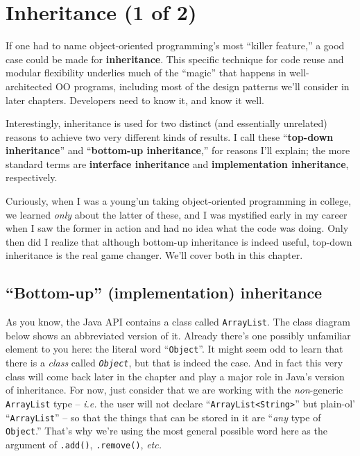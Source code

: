 
\chapter{Inheritance (1 of 2)}
\label{ch:inheritance}

If one had to name object-oriented programming's most ``killer feature,'' a
good case could be made for \textbf{inheritance}. This specific technique for
code reuse and modular flexibility underlies much of the ``magic'' that happens
in well-architected OO programs, including most of the design patterns we'll
consider in later chapters. Developers need to know it, and know it well.

Interestingly, inheritance is used for two distinct (and essentially
unrelated) reasons to achieve two very different kinds of results. I call
these ``\textbf{top-down inheritance}'' and ``\textbf{bottom-up inheritance},''
for reasons I'll explain; the more standard terms are \textbf{interface
inheritance} and \textbf{implementation inheritance}, respectively.

Curiously, when I was a young'un taking object-oriented programming in
college, we learned \textit{only} about the latter of these, and I was
mystified early in my career when I saw the former in action and had no idea
what the code was doing. Only then did I realize that although bottom-up
inheritance is indeed useful, top-down inheritance is the real game changer.
We'll cover both in this chapter.

\section[\small ``Bottom-up'' (implementation) inheritance]
{\large ``Bottom-up'' (implementation) inheritance}

As you know, the Java API contains a class called \texttt{ArrayList}. The
class diagram below shows an abbreviated version of it. Already there's one
possibly unfamiliar element to you here: the literal word ``\texttt{Object}''.
It might seem odd to learn that there is a \textit{class} called
\textit{\texttt{Object}}, but that is indeed the case. And in fact this very
class will come back later in the chapter and play a major role in Java's
version of inheritance. For now, just consider that we are working with the
\textit{non}-generic \texttt{ArrayList} type -- \textit{i.e.} the user will
not declare ``\texttt{ArrayList<String>}'' but plain-ol' ``\texttt{ArrayList}''
-- so that the things that can be stored in it are ``\textit{any} type of
\texttt{Object}.'' That's why we're using the most general possible word here
as the argument of \texttt{.add()}, \texttt{.remove()}, \textit{etc.}

